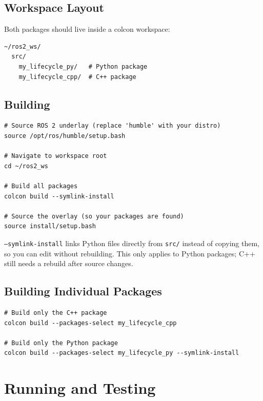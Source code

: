 \documentclass[12pt,a4paper]{article}
\newcommand{\code}[1]{\texttt{#1}}
\begin{document}
\subsection{Workspace Layout}

Both packages should live inside a colcon workspace:

\begin{lstlisting}[style=bash,caption={Workspace layout}]
~/ros2_ws/
  src/
    my_lifecycle_py/   # Python package
    my_lifecycle_cpp/  # C++ package
\end{lstlisting}

\subsection{Building}

\begin{lstlisting}[style=bash,caption={Build commands}]
# Source ROS 2 underlay (replace 'humble' with your distro)
source /opt/ros/humble/setup.bash

# Navigate to workspace root
cd ~/ros2_ws

# Build all packages
colcon build --symlink-install

# Source the overlay (so your packages are found)
source install/setup.bash
\end{lstlisting}

\begin{tipbox}
  \code{--symlink-install} links Python files directly from \code{src/}
  instead of copying them, so you can edit without rebuilding.  This only
  applies to Python packages; C++ still needs a rebuild after source changes.
\end{tipbox}

\subsection{Building Individual Packages}

\begin{lstlisting}[style=bash,caption={Build a single package}]
# Build only the C++ package
colcon build --packages-select my_lifecycle_cpp

# Build only the Python package
colcon build --packages-select my_lifecycle_py --symlink-install
\end{lstlisting}

\section{Running and Testing}
\label{sec:running}
\end{document}
